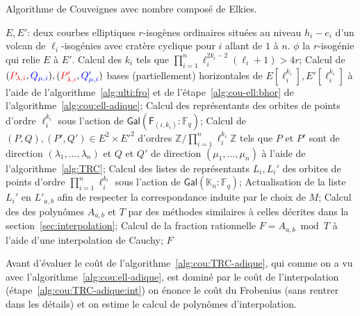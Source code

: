 \documentclass[10pt,a4paper]{book}
\theoremstyle{plain}
\theoremstyle{definition}
\theoremstyle{definition}
\theoremstyle{definition}
\theoremstyle{definition}
\theoremstyle{remark}
\theoremstyle{remark}
\theoremstyle{definition}
\begin{document}
\begin{algorithm}
\caption{\label{alg:cou:TRC-adique} Algorithme de Couveignes avec nombre composé de Elkies.}
\begin{algorithmic}[1]
\REQUIRE $E,E'$: deux courbes elliptiques $r$-isogènes ordinaires situées au niveau $h_i-e_i$ d'un volcan de $\ell_i$-isogénies avec cratère cyclique pour $i$ allant de $1$ à $n$.
\ENSURE $\phi$ la $r$-isogénie qui relie $E$ à $E'$.
\STATE Calcul des $k_i$ tels que $\prod_{i=1}^n\ell_{i}^{2k_{i}-2}(\ell_{i}+1)>4r$;
\STATE \label{alg:cou:TRC-adique:bhor} Calcul de $(\color{red}P_{\lambda,i}\color{black},\color{blue}Q_{\mu,i}\color{black}),(\color{red}P'_{\lambda,i}\color{black},\color{blue}Q_{\mu,i}'\color{black})$ bases (partiellement) horizontales de $E[\ell_i^{k_i}],E'[\ell_i^{k_i}]$ à l'aide de l'algorithme~\ref{alg:ulti:fro} et de l'étape~\ref{alg:cou-ell:bhor} de l'algorithme~\ref{alg:cou:ell-adique};
\STATE \label{alg:cou:TRC_adique:rep:uni} Calcul des représentants des orbites de points d'ordre $\ell_i^{k_i}$ sous l'action de $\mathsf{Gal}(\mathsf{F}_{(i,k_i)}:\mathbb{F}_q)$;
\ENDFOR
\STATE \label{alg:cou:TRC-adique:TRC} Calcul de $(P,Q),(P',Q') \in E^2 \times E'^2$ d'ordres $ \mathbb{Z}/\prod_{i=1}^n \ell_i^{k_i}\mathbb{Z}$ tels que $P$ et $P'$ sont de direction $(\lambda_1, \dots, \lambda_n)$ et $Q$ et $Q'$ de direction $(\mu_1, \dots, \mu_n)$ à l'aide de l'algorithme~\ref{alg:TRC};
\STATE \label{alg:cou:TRC-adique:rep} Calcul des listes de représentants $L_i,L_i'$ des orbites de points d'ordre $\prod_{i=1}^n \ell_i^{k_i}$ sous l'action de $\mathsf{Gal}(\mathbb{K}_n:\mathbb{F}_q)$;
\STATE \label{alg:cou:TRC-adique:ord} Actualisation de la liste $L_i'$ en $L'_{a,b}$ afin de respecter la correspondance induite par le choix de $M$;
\STATE \label{alg:cou:TRC-adique:int} Calcul des des polynômes $A_{a,b}$ et $T$ par des méthodes similaires à celles décrites dans la section~\ref{sec:interpolation};
\STATE \label{alg:cou:TRC-adique:Cauchy} Calcul de la fraction rationnelle $F=A_{a,b} \bmod T$ à l'aide d'une interpolation de Cauchy;
 \label{alg:cou:TRC-adique:test}
\RETURN $F$
\ENDIF
\ENDFOR 
\end{algorithmic}
\end{algorithm}

Avant d'évaluer le coût de l'algorithme~\ref{alg:cou:TRC-adique}, qui comme on
a vu avec l'algorithme~\ref{alg:cou:ell-adique}, est dominé par le coût de 
l'interpolation (étape~\ref{alg:cou:TRC-adique:int}) on énonce le coût du
Frobenius (sans rentrer dans les détails) et on estime le calcul de polynômes 
d'interpolation. 
\end{document}
